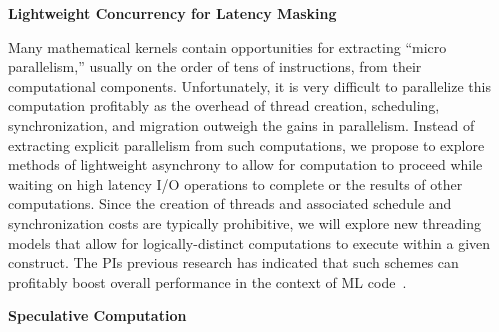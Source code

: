 \documentclass[12pt]{article}
\begin{document}
\bigskip
\noindent
{\bf  Lightweight Concurrency for Latency Masking}
\bigskip

Many mathematical kernels contain opportunities for extracting ``micro parallelism,''
usually on the order of tens of instructions, from their computational components. 
Unfortunately, it is very difficult to parallelize this computation profitably as
the overhead of thread creation, scheduling, synchronization, and migration outweigh
the gains in parallelism. Instead of extracting explicit parallelism from such
computations, we propose to explore methods of lightweight asynchrony to allow for
computation to proceed while waiting on high latency I/O operations to complete or
the results of other computations. Since the creation of threads and associated
schedule and synchronization costs are typically prohibitive, we will explore new
threading models that allow for logically-distinct computations to execute within
a given construct. The PIs previous research has indicated that such schemes can profitably
boost overall performance in the context of ML code~\cite{acml, parasites}. 

\bigskip
\noindent
{\bf Speculative Computation}
\bigskip
\end{document}
